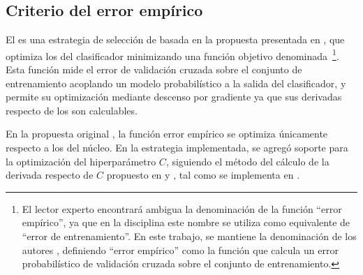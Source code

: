 %
%
\subsection{Criterio del error empírico}
%
El  es una estrategia de selección de
 basada en la propuesta presentada en \cite{ayat}, que
optimiza los  del clasificador minimizando una función
objetivo denominada \,\footnote{
  El lector experto encontrará ambigua la denominación de la función
  ``error empírico'', ya que en la disciplina este nombre se utiliza
  como equivalente de ``error de entrenamiento''.
  En este trabajo, se mantiene la denominación de los autores
  \cite{ayat}, definiendo ``error empírico'' como la función que
  calcula un error probabilístico de validación cruzada sobre el
  conjunto de entrenamiento.
}.
Esta función mide el error de validación cruzada sobre el conjunto de
entrenamiento acoplando un modelo probabilístico a la salida del
clasificador, y permite su optimización mediante descenso por
gradiente ya que sus derivadas respecto de los  son
calculables.

En la propuesta original \cite{ayat}, la función {error empírico} se
optimiza únicamente respecto a los  del núcleo.
En la estrategia implementada, se agregó soporte para la optimización
del hiperparámetro $C$, siguiendo el método del cálculo de la derivada
respecto de $C$ propuesto en \cite{keerthi} y \cite{glasmachers}, tal
como se implementa en \cite{shark}.
